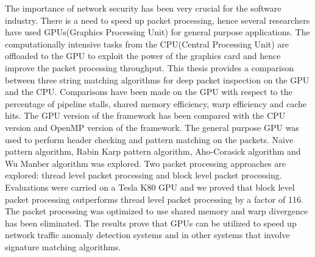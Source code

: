The importance of network security has been very crucial for the software industry. There is a need to speed up packet processing, hence several researchers have used GPUs(Graphics Processing Unit) for general purpose applications. The computationally intensive tasks from the CPU(Central Processing Unit) are offloaded to the GPU to exploit the power of the graphics card and hence improve the packet processing throughput. This thesis provides a comparison between three string matching algorithms for deep packet inspection on the GPU and the CPU. Comparisons have been made on the GPU with respect to the percentage of pipeline stalls, shared memory efficiency, warp efficiency and cache hits. The GPU version of the framework has been compared with the CPU version and OpenMP version of the framework. The general purpose GPU was used to perform header checking and pattern matching on the packets. Naive pattern algorithm, Rabin Karp pattern algorithm, Aho-Corasick algorithm and Wu Manber algorithm was explored. Two packet processing approaches are explored: thread level packet processing and block level packet processing. Evaluations were carried on a Tesla K80 GPU and we proved that block level packet processing outperforms thread level packet processing by a factor of 116. The packet processing was optimized to use shared memory and warp divergence has been eliminated. The results prove that GPUs can be utilized to speed up network traffic anomaly detection systems and in other systems that involve signature matching algorithms.

